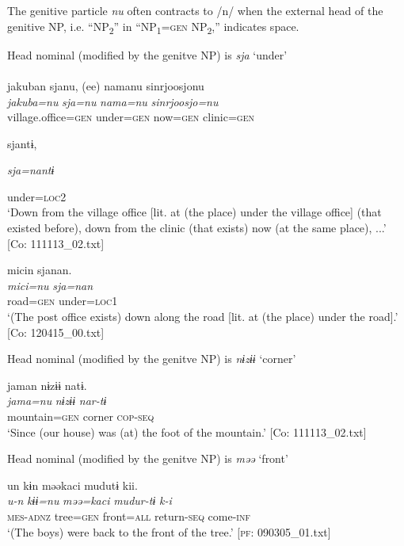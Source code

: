 \begin{table}
  The genitive particle \textit{nu} often contracts to /n/ when the external head of the genitive NP, i.e. “NP\textsubscript{2}” in “NP\textsubscript{1}=\textsc{gen} NP\textsubscript{2},” indicates space.

\ea\label{ex:6-81}
 Head nominal (modified by the genitve NP) is \textit{sja} ‘under’\\

 \ea{}\\
{\TM}
\glll  jakuban  sjanu,  (ee)  namanu  {\textbar}sinrjoosjo{\textbar}nu\\
\textit{jakuba=nu}  \textit{sja=nu}    \textit{nama=nu}  \textit{sinrjoosjo=nu}\\
village.office=\textsc{gen}  under=\textsc{gen}    now=\textsc{gen}  clinic=\textsc{gen}

      sjantɨ,

      \textit{sja=nantɨ}

      under=\textsc{loc}2\\
\glt ‘Down from the village office [lit. at (the place) under the village office] (that existed before), down from the clinic (that exists) now (at the same place), ...’ [Co: 111113\_02.txt]
\z

\ex {\TM}  micin  sjanan.\\
\glll \textit{mici=nu}  \textit{sja=nan}\\
road=\textsc{gen}  under=\textsc{loc}1\\
\glt ‘(The post office exists) down along the road [lit. at (the place) under the road].’ [Co: 120415\_00.txt]
\z

  Head nominal (modified by the genitve NP) is \textit{nɨzɨɨ} ‘corner’

\ex {\TM}  jaman  nɨzɨɨ  natɨ.\\
\glll \textit{jama=nu}  \textit{nɨzɨɨ}  \textit{nar-tɨ}\\
mountain=\textsc{gen}  corner  \textsc{cop}-\textsc{seq}\\
\glt ‘Since (our house) was (at) the foot of the mountain.’ [Co: 111113\_02.txt]
\z

  Head nominal (modified by the genitve NP) is \textit{məə} ‘front’

\ex {\TM}  un  kɨn  məəkaci  mudutɨ  kii.\\
\glll \textit{u-n}  \textit{kɨɨ=nu}  \textit{məə=kaci}  \textit{mudur-tɨ}  \textit{k-i}\\
\textsc{mes}-\textsc{adnz}  tree=\textsc{gen}  front=\textsc{all}  return-\textsc{seq}  come-\textsc{inf}\\
\glt ‘(The boys) were back to the front of the tree.’ [\textsc{pf}: 090305\_01.txt]
\z


\end{table}
